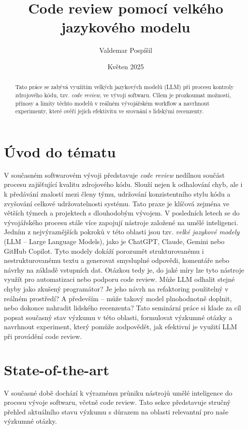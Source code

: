 \documentclass[12pt, a4paper]{article}
\title{Code review pomocí velkého jazykového modelu}
\author{Valdemar Pospíšil}
\date{Květen 2025}
\begin{document}
\maketitle

\begin{abstract}
Tato práce se zabývá využitím velkých jazykových modelů (LLM) při procesu kontroly zdrojového kódu, tzv. \textit{code review}, ve vývoji softwaru. Cílem je prozkoumat možnosti, přínosy a limity těchto modelů v reálném vývojářském workflow a navrhnout experimenty, které ověří jejich efektivitu ve srovnání s lidskými recenzenty.
\end{abstract}

\section{Úvod do tématu}
V současném softwarovém vývoji představuje \textit{code review} nedílnou součást procesu zajišťující kvalitu zdrojového kódu. Slouží nejen k odhalování chyb, ale i k předávání znalostí mezi členy týmu, udržování konzistentního stylu kódu a zvyšování celkové udržovatelnosti systému. Tato praxe je klíčová zejména ve větších týmech a projektech s dlouhodobým vývojem. V posledních letech se do vývojářského procesu stále více zapojují nástroje založené na umělé inteligenci. Jedním z nejvýraznějších pokroků v této oblasti jsou tzv. \textit{velké jazykové modely} (LLM – Large Language Models), jako je ChatGPT, Claude, Gemini nebo GitHub Copilot. Tyto modely dokáží porozumět strukturovanému i nestrukturovanému textu a generovat smysluplné odpovědi, komentáře nebo návrhy na základě vstupních dat. Otázkou tedy je, do jaké míry lze tyto nástroje využít pro automatizaci nebo podporu code review. Může LLM odhalit stejné chyby jako zkušený programátor? Je jeho návrh na refaktoring použitelný v reálném prostředí? A především – může takový model plnohodnotně doplnit, nebo dokonce nahradit lidského recenzenta? Tato seminární práce si klade za cíl popsat současný stav výzkumu v této oblasti, formulovat výzkumné otázky a navrhnout experiment, který pomůže zodpovědět, jak efektivní je využití LLM při provádění code review.
\newpage

\section{State-of-the-art}
V současné době dochází k výraznému průniku nástrojů umělé inteligence do procesu vývoje softwaru, včetně code review. Tato sekce představuje stručný přehled aktuálního stavu výzkumu s důrazem na oblasti relevantní pro naše výzkumné otázky.
\end{document}
